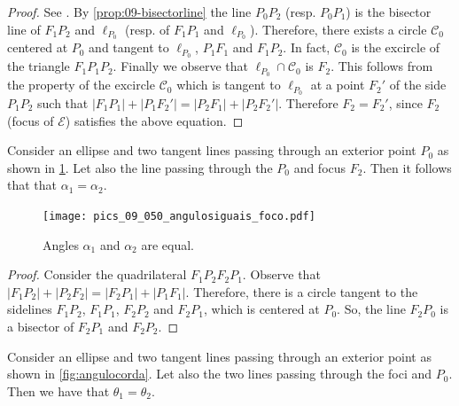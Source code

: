 \begin{proof}
See \cite[page 10]{akopyan2007-conics}. By \cref{prop:09-bisectorline} the line  $P_0P_2$ (resp. $P_0P_1$) is  the bisector line of $F_1P_2$ and $\ell_{P_0}$ (resp. of $F_1P_1$ and $\ell_{P_0}$). Therefore, there exists a circle $\mathcal{C}_0$ centered at $P_0$ and tangent to $\ell_{P_0}$, $P_1F_1$ and $F_1P_2.$ In fact, $\mathcal{C}_0$ is the excircle of the triangle $F_1P_1P_2$.
Finally we observe that $\ell_{P_0}\cap \mathcal{C}_0$ is $F_2.$ This follows from the property of the excircle $\mathcal{C}_0$ which is tangent to $\ell_{P_0}$ at a point $F_2'$ of the side $P_1P_2$ such that
$ |F_1P_1|+|P_1F_2'|=|P_2F_1| +|P_2F_2'|$. Therefore $F_2=F_2'$, since $F_2$ (focus of $\mathcal{E}$) satisfies the above equation.
\end{proof}
\begin{proposition} Consider an ellipse and two tangent lines passing through an exterior point $P_0$ as shown in   \cref{fig:angulofoco}. Let also the  line passing through the $P_0$ and   focus $F_2$.  Then it follows that that $\alpha_1=\alpha_2$. 
\end{proposition} 

\begin{figure} 
	\begin{center}
  \texttt{[image: pics\_09\_050\_angulosiguais\_foco.pdf]}
		\caption {Angles $\alpha_1$ and $\alpha_2$ are equal. 	\label{fig:angulofoco} }
	\end{center}

\end{figure}

\begin{proof} Consider the quadrilateral $F_1P_2F_2P_1.$
Observe that $|F_1P_2|+|P_2F_2|=|F_2P_1|+|P_1F_1|. $
Therefore, there is a circle tangent to the sidelines $F_1P_2$, $F_1P_1$, $F_2P_2$ and $F_2P_1$, which is centered at $P_0.$ So, the line $F_2P_0$ is a bisector of $F_2P_1$ and $F_2P_2.$
\end{proof}



\begin{proposition} Consider an ellipse and two tangent lines passing through an exterior point as shown in    \cref{fig:angulocorda}. Let also the two lines passing through the foci and $P_0$.  Then  we have that $\theta_1=\theta_2$. 
\end{proposition} 

